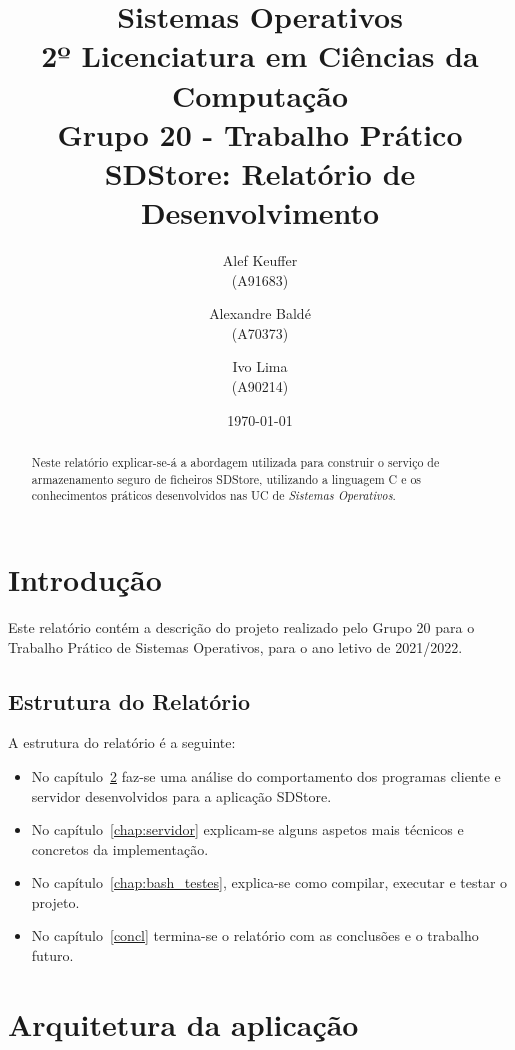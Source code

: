 \documentclass[11pt,a4paper]{report}%
\title{Sistemas Operativos\\
      2º Licenciatura em Ciências da Computação \\
      \textbf{Grupo 20 - Trabalho Prático}\\ SDStore: Relatório de Desenvolvimento
      } %
\author{Alef Keuffer\\ (A91683) \and Alexandre Baldé\\ (A70373)
         \and Ivo Lima\\ (A90214)
       } %
\date{\today} %
\def\so{\emph{Sistemas Operativos}\xspace}
\begin{document}
\maketitle %

\begin{abstract}  %
Neste relatório explicar-se-á a abordagem utilizada para construir o serviço de
armazenamento seguro de ficheiros SDStore, utilizando a linguagem C e os conhecimentos
práticos desenvolvidos nas UC de \so.
\end{abstract}

\tableofcontents %
\listoffigures %

\chapter{Introdução} \label{chap:intro} %

Este relatório contém a descrição do projeto realizado pelo Grupo 20 para
o Trabalho Prático de Sistemas Operativos, para o ano letivo de 2021/2022.

\section*{Estrutura do Relatório}

A estrutura do relatório é a seguinte:
\begin{itemize}
\item No capítulo~\ref{chap:analysis} faz-se uma análise do comportamento dos
  programas cliente e servidor desenvolvidos para a aplicação SDStore.

\item No capítulo~\ref{chap:servidor} explicam-se alguns aspetos mais técnicos e concretos da implementação.

\item No capítulo~\ref{chap:bash_testes}, explica-se como compilar, executar e testar o projeto.

\item No capítulo~\ref{concl} termina-se o relatório com as conclusões e o trabalho futuro.
\end{itemize}

\chapter{Arquitetura da aplicação} \label{chap:analysis} %
\end{document}
